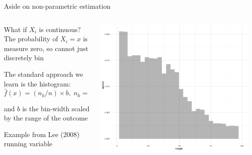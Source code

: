 \documentclass[notes,11pt, aspectratio=169]{beamer}
\newenvironment{wideitemize}{\itemize\addtolength{\itemsep}{10pt}}{\enditemize}
\begin{document}
\begin{frame}{Aside on non-parametric estimation}
  \begin{columns}[onlytextwidth, T] %
    \begin{column}{.6\textwidth}
      \begin{wideitemize}
      \item What if $X_{i}$ is continuous? The probability of $X_{i} =
        x$ is measure zero, so cannot just discretely bin
      \item The standard approach we learn is the histogram:
        \begin{equation*}
          \hat{f}(x) = (n_{k}/n) \times b, \; n_{k} = \sum_{i} 1(X_{i} \in \text{k interval}) 
        \end{equation*}
        and $b$ is the bin-width scaled by the range of the outcome
      \item Example from Lee (2008) running variable
      \end{wideitemize}
    \end{column}%
    \hfill%
    \begin{column}{.4\textwidth}
      \includegraphics[width=\linewidth]{images/lee_hist.png}
    \end{column}%
  \end{columns}
\end{frame}
\end{document}
